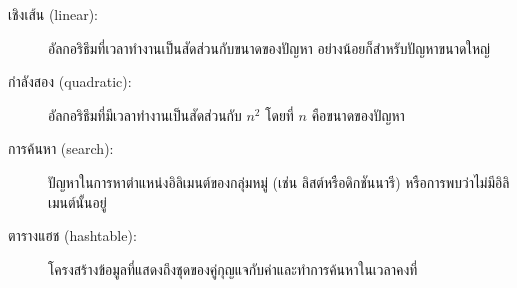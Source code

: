 \begin{description}
\item[เชิงเส้น (linear):] อัลกอริธึมที่เวลาทำงานเป็นสัดส่วนกับขนาดของปัญหา อย่างน้อยก็สำหรับปัญหาขนาดใหญ่

\item[กำลังสอง (quadratic):] อัลกอริธึมที่มีเวลาทำงานเป็นสัดส่วนกับ {\scriptsize$n^2$} 
โดยที่ {\scriptsize$n$} คือขนาดของปัญหา

\item[การค้นหา (search):] ปัญหาในการหาตำแหน่งอิลิเมนต์ของกลุ่มหมู่ (เช่น ลิสต์หรือดิกชันนารี) หรือการพบว่าไม่มีอิลิเมนต์นั้นอยู่

\item[ตารางแฮช (hashtable):] โครงสร้างข้อมูลที่แสดงถึงชุดของคู่กุญแจกับค่าและทำการค้นหาในเวลาคงที่

\end{description}

\printindex

\clearemptydoublepage



